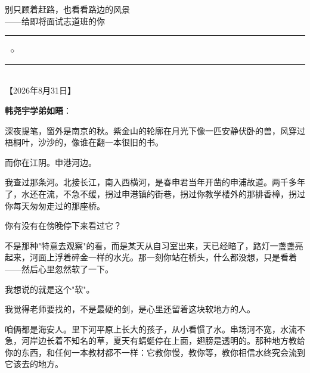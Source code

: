 \documentclass[12pt,a4paper]{article}
\begin{document}
\color{ink}

\begin{tcolorbox}[colback=lightbg, colframe=deepblue, boxrule=1pt,
                  arc=2mm, left=6mm, right=6mm, top=4mm, bottom=4mm]
  \centering
  {\color{deepblue}\Large\heiti 别只顾着赶路，也看看路边的风景}\\[0.4em]
  {\color{deepblue}\normalsize ——给即将面试志道班的你}\\[0.6em]
  \textcolor{softgold}{\rule{0.4\textwidth}{1pt}\ $\diamond$\ \rule{0.4\textwidth}{1pt}}\\[0.5em]
  {\small\color{gray}【2026年8月31日】}
\end{tcolorbox}

\vspace{1.4em}

\noindent\textbf{\large 韩尧宇学弟如晤}：\par
\vspace{0.4em}

深夜提笔，窗外是南京的秋。紫金山的轮廓在月光下像一匹安静伏卧的兽，风穿过梧桐叶，沙沙的，像谁在翻一本很旧的书。\par

而你在江阴。申港河边。\par

我查过那条河。北接长江，南入西横河，是春申君当年开凿的申浦故道。两千多年了，水还在流，不急不缓，拐过申港镇的街巷，拐过你教学楼外的那排香樟，拐过你每天匆匆走过的那座桥。\par

你有没有在傍晚停下来看过它？\par

不是那种"特意去观察"的看，而是某天从自习室出来，天已经暗了，路灯一盏盏亮起来，河面上浮着碎金一样的水光。那一刻你站在桥头，什么都没想，只是看着——然后心里忽然软了一下。\par

我想说的就是这个"软"。\par

我觉得老师要找的，不是最硬的剑，是心里还留着这块软地方的人。\par

咱俩都是海安人。里下河平原上长大的孩子，从小看惯了水。串场河不宽，水流不急，河岸边长着不知名的草，夏天有蜻蜓停在上面，翅膀是透明的。那种地方教给你的东西，和任何一本教材都不一样：它教你慢，教你等，教你相信水终究会流到它该去的地方。\par
\end{document}
